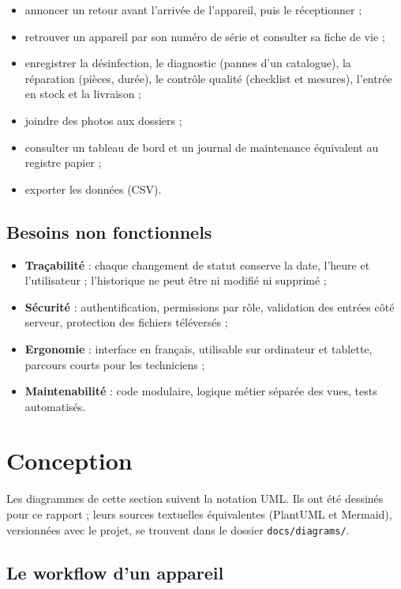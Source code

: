 \begin{itemize}
  \item annoncer un retour avant l'arrivée de l'appareil, puis le réceptionner ;
  \item retrouver un appareil par son numéro de série et consulter sa fiche de vie ;
  \item enregistrer la désinfection, le diagnostic (pannes d'un catalogue), la réparation (pièces, durée), le contrôle qualité (checklist et mesures), l'entrée en stock et la livraison ;
  \item joindre des photos aux dossiers ;
  \item consulter un tableau de bord et un journal de maintenance équivalent au registre papier ;
  \item exporter les données (CSV).
\end{itemize}

\subsection{Besoins non fonctionnels}

\begin{itemize}
  \item \textbf{Traçabilité} : chaque changement de statut conserve la date, l'heure et l'utilisateur ; l'historique ne peut être ni modifié ni supprimé ;
  \item \textbf{Sécurité} : authentification, permissions par rôle, validation des entrées côté serveur, protection des fichiers téléversés ;
  \item \textbf{Ergonomie} : interface en français, utilisable sur ordinateur et tablette, parcours courts pour les techniciens ;
  \item \textbf{Maintenabilité} : code modulaire, logique métier séparée des vues, tests automatisés.
\end{itemize}

\section{Conception}

Les diagrammes de cette section suivent la notation UML. Ils ont été dessinés pour ce rapport ; leurs sources textuelles équivalentes (PlantUML et Mermaid), versionnées avec le projet, se trouvent dans le dossier \texttt{docs/\allowbreak{}diagrams/\allowbreak{}}.

\subsection{Le workflow d'un appareil}

